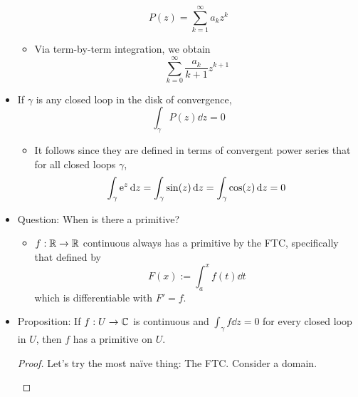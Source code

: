 \documentclass[../notes.tex]{subfiles}
\begin{document}
\begin{itemize}
    \begin{equation*}
        P(z) = \sum_{k=1}^\infty a_kz^k
    \end{equation*}
    \begin{itemize}
        \item Via term-by-term integration, we obtain
        \begin{equation*}
            \sum_{k=0}^\infty\frac{a_k}{k+1}z^{k+1}
        \end{equation*}
    \end{itemize}
    \item If $\gamma$ is any closed loop in the disk of convergence,
    \begin{equation*}
        \int_\gamma P(z)\dd{z} = 0
    \end{equation*}
    \begin{itemize}
        \item It follows since they are defined in terms of convergent power series that for all closed loops $\gamma$,
        \begin{equation*}
            \int_\gamma\e[z]\dd{z} = \int_\gamma\sin(z)\dd{z}
            = \int_\gamma\cos(z)\dd{z}
            = 0
        \end{equation*}
    \end{itemize}
    \item Question: When is there a primitive?
    \begin{itemize}
        \item $f:\R\to\R$ continuous always has a primitive by the FTC, specifically that defined by
        \begin{equation*}
            F(x) := \int_a^xf(t)\dd{t}
        \end{equation*}
        which is differentiable with $F'=f$.
    \end{itemize}
    \item Proposition: If $f:U\to\C$ is continuous and $\int_\gamma f\dd{z}=0$ for every closed loop in $U$, then $f$ has a primitive on $U$.
    \begin{proof}
        Let's try the most na\"{i}ve thing: The FTC. Consider a domain.
        \begin{figure}[H]
            \centering
\end{figure}
\end{proof}
\end{itemize}
\end{document}
